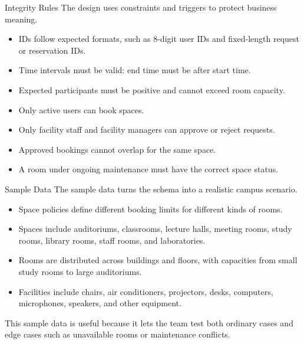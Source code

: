 \documentclass[aspectratio=169]{beamer}
\begin{document}
\begin{frame}{Integrity Rules}
    The design uses constraints and triggers to protect business meaning.

    \begin{itemize}
        \item IDs follow expected formats, such as 8-digit user IDs and fixed-length request or reservation IDs.
        \item Time intervals must be valid: end time must be after start time.
        \item Expected participants must be positive and cannot exceed room capacity.
        \item Only active users can book spaces.
        \item Only facility staff and facility managers can approve or reject requests.
        \item Approved bookings cannot overlap for the same space.
        \item A room under ongoing maintenance must have the correct space status.
    \end{itemize}
\end{frame}

\begin{frame}{Sample Data}
    The sample data turns the schema into a realistic campus scenario.

    \begin{itemize}
        \item Space policies define different booking limits for different kinds of rooms.
        \item Spaces include auditoriums, classrooms, lecture halls, meeting rooms, study rooms, library rooms, staff rooms, and laboratories.
        \item Rooms are distributed across buildings and floors, with capacities from small study rooms to large auditoriums.
        \item Facilities include chairs, air conditioners, projectors, desks, computers, microphones, speakers, and other equipment.
    \end{itemize}

    \vspace{0.3cm}
    This sample data is useful because it lets the team test both ordinary cases
    and edge cases such as unavailable rooms or maintenance conflicts.
\end{frame}
\end{document}
